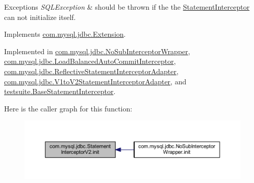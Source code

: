 \begin{DoxyExceptions}{Exceptions}
{\em S\+Q\+L\+Exception} & should be thrown if the the \mbox{\hyperlink{interfacecom_1_1mysql_1_1jdbc_1_1_statement_interceptor}{Statement\+Interceptor}} can not initialize itself. \\
\hline
\end{DoxyExceptions}


Implements \mbox{\hyperlink{interfacecom_1_1mysql_1_1jdbc_1_1_extension_a79427811058193260bd4df0c38414e88}{com.\+mysql.\+jdbc.\+Extension}}.



Implemented in \mbox{\hyperlink{classcom_1_1mysql_1_1jdbc_1_1_no_sub_interceptor_wrapper_a7272676b9081fbf866a494f4d35b3a6d}{com.\+mysql.\+jdbc.\+No\+Sub\+Interceptor\+Wrapper}}, \mbox{\hyperlink{classcom_1_1mysql_1_1jdbc_1_1_load_balanced_auto_commit_interceptor_a7ac3a68deb0ddbc6ede5ece0824d3189}{com.\+mysql.\+jdbc.\+Load\+Balanced\+Auto\+Commit\+Interceptor}}, \mbox{\hyperlink{classcom_1_1mysql_1_1jdbc_1_1_reflective_statement_interceptor_adapter_ae2a1db7cc624f326d2a0bf7d1b5b6e3d}{com.\+mysql.\+jdbc.\+Reflective\+Statement\+Interceptor\+Adapter}}, \mbox{\hyperlink{classcom_1_1mysql_1_1jdbc_1_1_v1to_v2_statement_interceptor_adapter_acf5784b9b687c7d58d92492e2bd6a800}{com.\+mysql.\+jdbc.\+V1to\+V2\+Statement\+Interceptor\+Adapter}}, and \mbox{\hyperlink{classtestsuite_1_1_base_statement_interceptor_a9f780bb34bc2101037455ca81d1c2a16}{testsuite.\+Base\+Statement\+Interceptor}}.

Here is the caller graph for this function\+:
\nopagebreak
\begin{figure}[H]
\begin{center}
\leavevmode
\includegraphics[width=350pt]{interfacecom_1_1mysql_1_1jdbc_1_1_statement_interceptor_v2_ae2d3d924826dcf4a4e025433af0b4d8f_icgraph}
\end{center}
\end{figure}
\mbox{\label{interfacecom_1_1mysql_1_1jdbc_1_1_statement_interceptor_v2_a6dadce27d32c6beaa303d46515307320}} 
